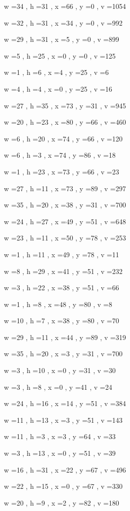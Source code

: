 \documentclass[11pt]{article}
\begin{document}
w =34 , h =31 , x =66 , y =0 , v =1054
\par
w =32 , h =31 , x =34 , y =0 , v =992
\par
w =29 , h =31 , x =5 , y =0 , v =899
\par
w =5 , h =25 , x =0 , y =0 , v =125
\par
w =1 , h =6 , x =4 , y =25 , v =6
\par
w =4 , h =4 , x =0 , y =25 , v =16
\par
w =27 , h =35 , x =73 , y =31 , v =945
\par
w =20 , h =23 , x =80 , y =66 , v =460
\par
w =6 , h =20 , x =74 , y =66 , v =120
\par
w =6 , h =3 , x =74 , y =86 , v =18
\par
w =1 , h =23 , x =73 , y =66 , v =23
\par
w =27 , h =11 , x =73 , y =89 , v =297
\par
w =35 , h =20 , x =38 , y =31 , v =700
\par
w =24 , h =27 , x =49 , y =51 , v =648
\par
w =23 , h =11 , x =50 , y =78 , v =253
\par
w =1 , h =11 , x =49 , y =78 , v =11
\par
w =8 , h =29 , x =41 , y =51 , v =232
\par
w =3 , h =22 , x =38 , y =51 , v =66
\par
w =1 , h =8 , x =48 , y =80 , v =8
\par
w =10 , h =7 , x =38 , y =80 , v =70
\par
w =29 , h =11 , x =44 , y =89 , v =319
\par
w =35 , h =20 , x =3 , y =31 , v =700
\par
w =3 , h =10 , x =0 , y =31 , v =30
\par
w =3 , h =8 , x =0 , y =41 , v =24
\par
w =24 , h =16 , x =14 , y =51 , v =384
\par
w =11 , h =13 , x =3 , y =51 , v =143
\par
w =11 , h =3 , x =3 , y =64 , v =33
\par
w =3 , h =13 , x =0 , y =51 , v =39
\par
w =16 , h =31 , x =22 , y =67 , v =496
\par
w =22 , h =15 , x =0 , y =67 , v =330
\par
w =20 , h =9 , x =2 , y =82 , v =180
\par
\newpage
\end{document}
